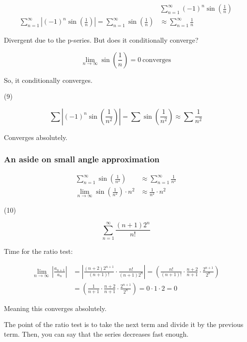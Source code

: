\documentclass[12pt]{article}
\theoremstyle{plain}
\theoremstyle{remark}
\theoremstyle{definition}
\begin{document}
\begin{align*}
&\sum_{n = 1}^{\infty}{( - 1)^{n}\sin\left( \frac{1}{n} \right)} \\
\sum_{n = 1}^{\infty}\left| ( - 1)^{n}\sin\left( \frac{1}{n} \right) \right| = \sum_{n = 1}^{\infty}{\sin\left( \frac{1}{n} \right)} &\approx \sum_{n = 1}^{\infty}\frac{1}{n}
\end{align*}


Divergent due to the p-series. But does it conditionally converge?

\[\lim_{n \rightarrow \infty}{\sin\left( \frac{1}{n} \right)} = 0\ \text{converges}\]

So, it conditionally converges.

(9)

\[\sum_{}^{}\left| ( - 1)^{n}\sin\left( \frac{1}{n^{2}} \right) \right| = \sum_{}^{}{\sin\left( \frac{1}{n^{2}} \right)} \approx \sum_{}^{}\frac{1}{n^{2}}\]

Converges absolutely.


\subsubsection{An aside on small angle
approximation}

\begin{align*}
\sum_{n = 1}^{\infty}{\sin\left( \frac{1}{n^{2}} \right)} &\approx \sum_{n = 1}^{\infty}\frac{1}{n^{2}} \\
\lim_{n \rightarrow \infty}{\sin\left( \frac{1}{n^{2}} \right) \cdot n^{2}} &\approx \frac{1}{n^{2}} \cdot n^{2}
\end{align*}


(10)

\[\sum_{n = 1}^{\infty}\frac{(n + 1)2^{n}}{n!}\]

Time for the ratio test:

\begin{align*}
\lim_{n \rightarrow \infty\ }\left| \frac{a_{n + 1}}{a_{n}} \right| &= \left| \frac{(n + 2)2^{n + 1}}{(n + 1)!} \cdot \frac{n!}{(n + 1)2^{n}} \right| = \left( \frac{n!}{(n + 1)!} \cdot \frac{n + 2}{n + 1} \cdot \frac{2^{n + 1}}{2^{n}} \right) \\
&= \left( \frac{1}{n + 1} \cdot \frac{n + 2}{n + 1} \cdot \frac{2^{n + 1}}{2^{n}} \right) = 0 \cdot 1 \cdot 2 = 0
\end{align*}


Meaning this converges absolutely.

The point of the ratio test is to take the next term and divide it by
the previous term. Then, you can say that the series decreases fast
enough.
\end{document}
